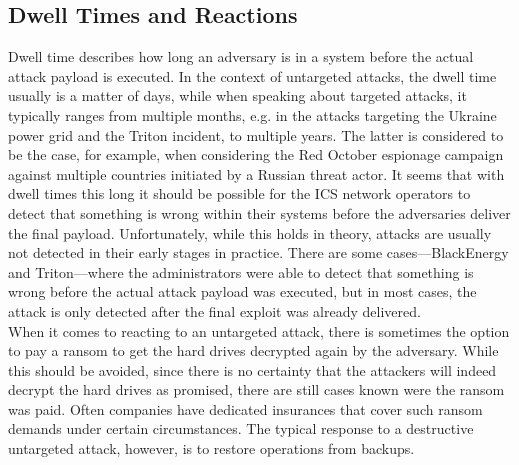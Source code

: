 \documentclass[runningheads]{llncs}
\begin{document}
\subsection{Dwell Times and Reactions}
\label{subsection:overview-reactions}
Dwell time describes how long an adversary is in a system before the actual attack payload is executed.
In the context of untargeted attacks, the dwell time usually is a matter of days, while when speaking about targeted attacks, it typically ranges from multiple months, e.g. in the attacks targeting the Ukraine power grid and the Triton incident, to multiple years.
The latter is considered to be the case, for example, when considering the Red October espionage campaign against multiple countries initiated by a Russian threat actor.
It seems that with dwell times this long it should be possible for the ICS network operators to detect that something is wrong within their systems before the adversaries deliver the final payload.
Unfortunately, while this holds in theory, attacks are usually not detected in their early stages in practice.
There are some cases---BlackEnergy and Triton---where the administrators were able to detect that something is wrong before the actual attack payload was executed, but in most cases, the attack is only detected after the final exploit was already delivered.\\
When it comes to reacting to an untargeted attack, there is sometimes the option to pay a ransom to get the hard drives decrypted again by the adversary.
While this should be avoided, since there is no certainty that the attackers will indeed decrypt the hard drives as promised, there are still cases known were the ransom was paid.
Often companies have dedicated insurances that cover such ransom demands under certain circumstances.
The typical response to a destructive untargeted attack, however, is to restore operations from backups.
\end{document}
